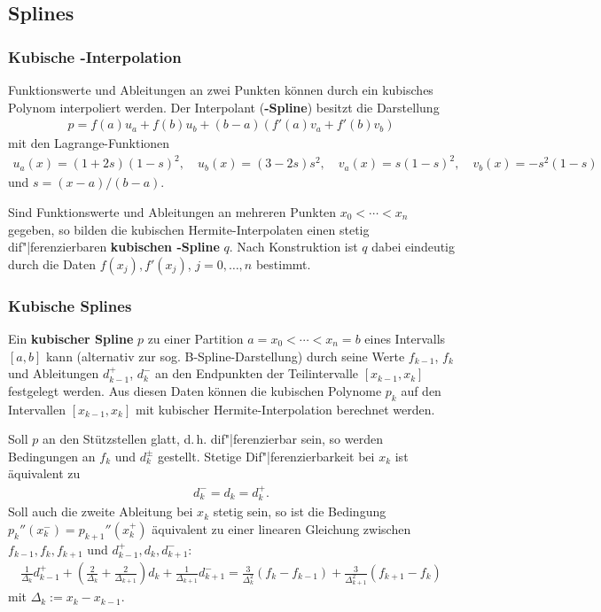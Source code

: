 \pagebreak

\subsection{%
    Splines%
}

\subsubsection{%
    Kubische -Interpolation%
}

Funktionswerte und Ableitungen an zwei Punkten können durch ein kubisches
Polynom interpoliert werden.
Der Interpolant (\textbf{-Spline}) besitzt die Darstellung
\begin{align*}
    p = f(a) u_a + f(b) u_b + (b - a)(f'(a) v_a + f'(b) v_b)
\end{align*}
mit den Lagrange-Funktionen
\begin{align*}
    u_a(x) = (1 + 2s)(1 - s)^2, \quad
    u_b(x) = (3 - 2s)s^2, \quad
    v_a(x) = s(1 - s)^2, \quad
    v_b(x) = -s^2 (1 - s)
\end{align*}
und $s = (x - a) / (b - a)$.

Sind Funktionswerte und Ableitungen an mehreren Punkten $x_0 < \dotsb < x_n$
gegeben, so bilden die kubischen Hermite-Interpolaten einen stetig
dif"|ferenzierbaren \textbf{kubischen -Spline} $q$.
Nach Konstruktion ist $q$ dabei eindeutig durch die Daten $f(x_j), f'(x_j)$,
$j = 0, \dotsc, n$ bestimmt.

\subsubsection{%
    Kubische Splines%
}

Ein \textbf{kubischer Spline} $p$ zu einer Partition
$a = x_0 < \dotsb < x_n = b$ eines Intervalls $[a, b]$ kann
(alternativ zur sog. B-Spline-Darstellung) durch seine Werte $f_{k-1}$, $f_k$
und Ableitungen $d_{k-1}^+$, $d_k^-$ an den Endpunkten der Teilintervalle
$[x_{k-1}, x_k]$ festgelegt werden.
Aus diesen Daten können die kubischen Polynome $p_k$ auf den Intervallen
$[x_{k-1}, x_k]$ mit kubischer Hermite-Interpolation berechnet werden.

Soll $p$ an den Stützstellen glatt, d.\,h. dif"|ferenzierbar sein, so
werden Bedingungen an $f_k$ und $d_k^\pm$ gestellt.
Stetige Dif"|ferenzierbarkeit bei $x_k$ ist äquivalent zu
\begin{align*}
    d_k^{-} = d_k = d_k^{+}.
\end{align*}
Soll auch die zweite Ableitung bei $x_k$ stetig sein, so ist die Bedingung
$p_k''(x_k^-) = p_{k+1}''(x_k^+)$ äquivalent zu einer linearen Gleichung
zwischen $f_{k-1}, f_k, f_{k+1}$ und $d_{k-1}^+, d_k, d_{k+1}^-$:
\begin{align*}
    \frac{1}{\Delta_k} d_{k-1}^+ +
    \left(\frac{2}{\Delta_k} + \frac{2}{\Delta_{k+1}}\right) d_k +
    \frac{1}{\Delta_{k+1}} d_{k+1}^- =
    \frac{3}{\Delta_k^2} (f_k - f_{k-1}) +
    \frac{3}{\Delta_{k+1}^2} (f_{k+1} - f_k)
\end{align*}
mit $\Delta_k := x_k - x_{k-1}$.

